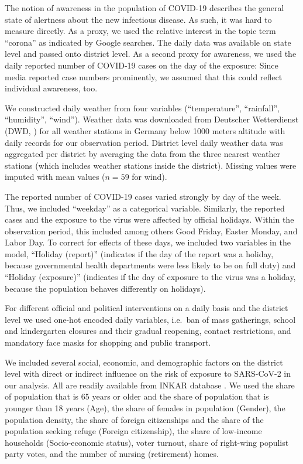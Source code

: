 \documentclass[10pt,letterpaper]{article}
\begin{document}
The notion of awareness in the population of COVID-19 describes the
general state of alertness about the new infectious disease. As such, it
was hard to measure directly. As a proxy, we used the relative interest
in the topic term ``corona'' as indicated by Google searches. The daily
data was available on state level \cite{google_trends} and passed onto
district level. As a second proxy for awareness, we used the daily
reported number of COVID-19 cases on the day of the exposure: Since
media reported case numbers prominently, we assumed that this could
reflect individual awareness, too.

We constructed daily weather from four variables (``temperature'',
``rainfall'', ``humidity'', ``wind''). Weather data was downloaded from
Deutscher Wetterdienst (DWD, \cite{dwd_weather}) for all weather
stations in Germany below 1000 meters altitude with daily records for
our observation period. District level daily weather data was aggregated
per district by averaging the data from the three nearest weather
stations (which includes weather stations inside the district). Missing
values were imputed with mean values (\(n=59\) for wind).

The reported number of COVID-19 cases varied strongly by day of the
week. Thus, we included ``weekday'' as a categorical variable.
Similarly, the reported cases and the exposure to the virus were
affected by official holidays. Within the observation period, this
included among others Good Friday, Easter Monday, and Labor Day. To
correct for effects of these days, we included two variables in the
model, ``Holiday (report)'' (indicates if the day of the report was a
holiday, because governmental health departments were less likely to be
on full duty) and ``Holiday (exposure)'' (indicates if the day of
exposure to the virus was a holiday, because the population behaves
differently on holidays).

For different official and political interventions on a daily basis and the district level we used one-hot encoded daily variables, i.e.~ban of mass gatherings, school and kindergarten closures and their gradual reopening, contact restrictions, and mandatory face masks for shopping and public transport.

We included several social, economic, and demographic factors on the
district level with direct or indirect influence on the risk of exposure
to SARS-CoV-2 in our analysis. All are readily available from INKAR
database \cite{inkar}. We used the share of population that is 65 years
or older and the share of population that is younger than 18 years
(Age), the share of females in population (Gender), the population
density, the share of foreign citizenships and the share of the
population seeking refuge (Foreign citizenship), the share of low-income
households (Socio-economic status), voter turnout, share of right-wing
populist party votes, and the number of nursing (retirement) homes.
\end{document}
